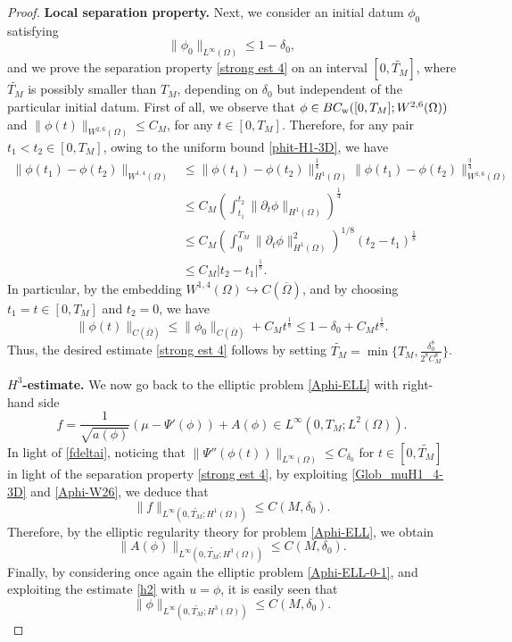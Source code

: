 \documentclass[11pt,reqno]{amsart}
\theoremstyle{remark}
\numberwithin{equation}{section}
\begin{document}
\begin{proof}
\bigskip
\textbf{Local separation property.}
Next, we consider an initial datum $\phi_0$ satisfying 
$$
\| \phi_0\|_{L^\infty(\Omega)}\leq 1- \delta_0,
$$ 
and we prove the separation property \eqref{strong est 4} on an interval $[0,\widetilde{T_M}]$, where $\widetilde{T_M}$ is possibly smaller than $T_M$, depending on $\delta_0$ but independent of the particular initial datum. 
First of all, we observe that $\phi\in BC_{\rm w}([0,T_M]; W^{2,6}(\Omega))$ and $\| \phi(t)\|_{W^{2,6}(\Omega)} \leq C_M$, for any $t\in [0,T_M]$. Therefore, for any pair $t_1<t_2\in [0,T_M]$, owing to the uniform bound
\eqref{phit-H1-3D}, we have
\begin{align*}
\|\phi(t_1)-\phi(t_2)\|_{W^{1,4}(\Omega)}&\leq \|\phi(t_1)-\phi(t_2)\|_{H^1(\Omega)}^\frac{1}{4}\|\phi(t_1)-\phi(t_2)\|_{W^{1,6}(\Omega)}^{\frac{3}{4}}\\
&\leq C_M\left(\int_{t_1}^{t_2}\|\partial_t\phi\|_{H^1(\Omega)}\right)^\frac{1}{4}\\
&\leq C_M\left(\int_{0}^{T_M}\|\partial_t\phi\|_{H^1(\Omega)}^2\right)^{1/8}(t_2-t_1)^\frac{1}{8}\\
&\leq C_M|t_2-t_1|^\frac{1}{8}.
\end{align*}
In particular, by the embedding $W^{1,4}(\Omega) \hookrightarrow C(\overline{\Omega})$, and by choosing  $t_1=t\in [0,T_M]$ and $t_2=0$, we have
$$
\|\phi(t)\|_{C(\overline{\Omega})}
\leq \|\phi_0\|_{C(\overline{\Omega})}
+C_M t^\frac18
\leq 1-\delta_0+C_M t^\frac18.
$$
Thus, the desired estimate \eqref{strong est 4} follows by setting $\widetilde{T_M}=\min\{T_M,\frac{\delta_0^8 }{2^8C_M^8}\}$.
\bigskip

\textbf{$H^3$-estimate.}
We now go back to the elliptic problem \eqref{Aphi-ELL} with right-hand side
$$
f= \frac{1}{\sqrt{a(\phi)}} \left( \mu- \Psi'(\phi) \right) + A(\phi)\in L^\infty(0,T_M; L^2(\Omega)).
$$
In light of \eqref{fdeltai}, noticing that $\| \Psi''(\phi(t))\|_{L^\infty(\Omega)}\leq C_{\delta_0}$ for $t\in [0, \widetilde{T_M}]$ in light of the separation property \eqref{strong est 4}, by exploiting \eqref{Glob_muH1_4-3D} and \eqref{Aphi-W26}, we deduce that
$$
\| f \|_{L^\infty(0,\widetilde{T_M}; H^1(\Omega))}\leq C(M,\delta_0).
$$
Therefore, by the elliptic regularity theory for problem \eqref{Aphi-ELL}, we obtain
$$
\| A(\phi) \|_{L^\infty(0,\widetilde{T_M}; H^3(\Omega))} \leq C(M,\delta_0).
$$
Finally, by considering once again the elliptic problem \eqref{Aphi-ELL-0-1}, 
and exploiting the estimate \eqref{h2} with $u=\phi$, it is easily seen that
\begin{equation}
\label{fiH3}
\| \phi\|_{L^\infty(0,\widetilde{T_M}; H^3(\Omega))}\leq C(M,\delta_0).
\end{equation}
\medskip


\end{proof}
\end{document}

